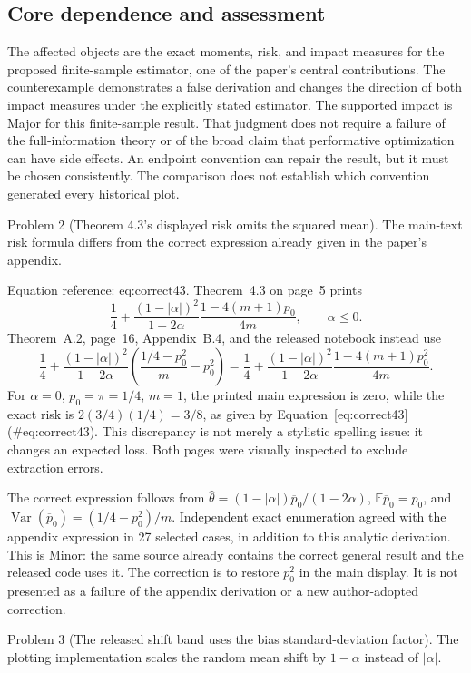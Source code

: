 \documentclass[10pt]{article}
\begin{document}
\subsection*{Core dependence and assessment}
The affected objects are the exact moments, risk, and impact measures for the proposed finite-sample estimator, one of the paper’s central contributions. The counterexample demonstrates a false derivation and changes the direction of both impact measures under the explicitly stated estimator. The supported impact is Major for this finite-sample result. That judgment does not require a failure of the full-information theory or of the broad claim that performative optimization can have side effects. An endpoint convention can repair the result, but it must be chosen consistently. The comparison does not establish which convention generated every historical plot.\par
Problem 2 (Theorem 4.3’s displayed risk omits the squared mean).  The main-text risk formula differs from the correct expression already given in the paper’s appendix.\par
Equation reference: eq:correct43. Theorem 4.3 on page 5 prints \[\frac14+\frac{(1-|\alpha|)^2}{1-2\alpha}
              \frac{1-4(m+1)p_0}{4m},\qquad \alpha\leq0.\] Theorem A.2, page 16, Appendix B.4, and the released notebook instead use \[
 \frac14+\frac{(1-|\alpha|)^2}{1-2\alpha}
       \left(\frac{1/4-p_0^2}{m}-p_0^2\right)
 =\frac14+\frac{(1-|\alpha|)^2}{1-2\alpha}
              \frac{1-4(m+1)p_0^2}{4m}.\] For \(\alpha=0\), \(p_0=\pi=1/4\), \(m=1\), the printed main expression is zero, while the exact risk is \(2(3/4)(1/4)=3/8\), as given by Equation [eq:correct43] (\#eq:correct43). This discrepancy is not merely a stylistic spelling issue: it changes an expected loss. Both pages were visually inspected to exclude extraction errors.\par
The correct expression follows from \(\widehat\theta=(1-|\alpha|)\overline p_0/(1-2\alpha)\), \(\mathbb E\overline p_0=p_0\), and \(\operatorname{Var}(\overline p_0)=(1/4-p_0^2)/m\). Independent exact enumeration agreed with the appendix expression in 27 selected cases, in addition to this analytic derivation. This is Minor: the same source already contains the correct general result and the released code uses it. The correction is to restore \(p_0^2\) in the main display. It is not presented as a failure of the appendix derivation or a new author-adopted correction.\par
Problem 3 (The released shift band uses the bias standard-deviation factor).  The plotting implementation scales the random mean shift by \(1-\alpha\) instead of \(|\alpha|\).\par
\end{document}
